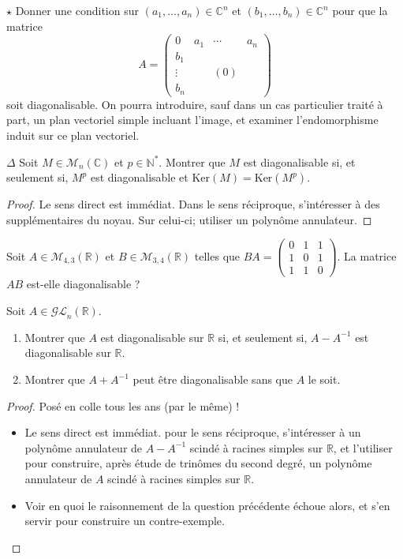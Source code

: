 \documentclass[french,a4paper]{article}
\newcommand{\N}{\mathbb{N}}
\newcommand{\R}{\mathbb{R}}
\newcommand{\C}{\mathbb{C}}
\newcommand{\st}{^*}
\newcommand{\inv}{^{-1}}
\renewcommand{\ker}{\text{Ker}}
\theoremstyle{plain}
\theoremstyle{definition}
\theoremstyle{remark}
\begin{document}
\begin{ex}{$\star$}
	Donner une condition sur $(a_1,\ldots,a_n)\in\C^n$ et $(b_1,\ldots,b_n)\in\C^n$ pour que la matrice $$A=\begin{pmatrix}
		0&a_1&\cdots&a_n\\
		b_1&&&\\
		\vdots&&(0)&\\
		b_n&&&
	\end{pmatrix}$$ soit diagonalisable. On pourra introduire, sauf dans un cas particulier traité à part, un plan vectoriel simple incluant l'image, et examiner l'endomorphisme induit sur ce plan vectoriel.
\end{ex}

\begin{ex}{$\Delta$}
	Soit $M\in\mathcal{M}_n(\C)$ et $p\in\N\st$. Montrer que $M$ est diagonalisable si, et seulement si, $M^p$ est diagonalisable et $\ker(M)=\ker(M^p)$.
\end{ex}
\begin{proof}
	Le sens direct est immédiat. Dans le sens réciproque, s'intéresser à des supplémentaires du noyau. Sur celui-ci; utiliser un polynôme annulateur.
\end{proof}

\begin{ex}{}
	Soit $A\in\mathcal{M}_{4,3}(\R)$ et $B\in\mathcal{M}_{3,4}(\R)$ telles que $BA=\displaystyle\begin{pmatrix}
		0&1&1\\
		1&0&1\\
		1&1&0
	\end{pmatrix}$. La matrice $AB$ est-elle diagonalisable ?
\end{ex}

\begin{ex}[Morlot]{}
	Soit $A\in\mathcal{GL}_n(\R)$.
	\begin{enumerate}
		\item Montrer que $A$ est diagonalisable sur $\R$ si, et seulement si, $A-A\inv$ est diagonalisable sur $\R$.
		\item Montrer que $A+A\inv$ peut être diagonalisable sans que $A$ le soit.
	\end{enumerate}
\end{ex}
\begin{proof}
	Posé en colle tous les ans (par le même) !
	\begin{itemize}
		\item Le sens direct est immédiat. pour le sens réciproque, s'intéresser à un polynôme annulateur de $A-A\inv$ scindé à racines simples sur $\R$, et l'utiliser pour construire, après étude de trinômes du second degré, un polynôme annulateur de $A$ scindé à racines simples sur $\R$.
		\item Voir en quoi le raisonnement de la question précédente échoue alors, et s'en servir pour construire un contre-exemple. 
	\end{itemize}
\end{proof}
\end{document}
